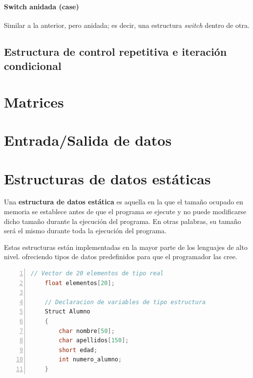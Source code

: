 \documentclass[a4paper, 11pt, titlepage]{article}
\begin{document}
            \paragraph{Switch anidada (case)} Similar a la anterior, pero anidada; es decir,
            una estructura \textit{switch} dentro de otra.

    \subsection{Estructura de control repetitiva e iteración condicional}


\section{Matrices}
    

\section{Entrada/Salida de datos}


\section{Estructuras de datos estáticas}

    Una \textbf{estructura de datos estática} es aquella en la que el tamaño ocupado en memoria se
    establece antes de que el programa se ejecute y no puede modificarse dicho tamaño durante
    la ejecución del programa. En otras palabras, su tamaño será el mismo durante toda la ejecución
    del programa.

    Estas estructuras están implementadas en la mayor parte de los lenguajes de alto nivel. ofreciendo
    tipos de datos predefinidos para que el programador las cree.

    \begin{lstlisting}[language=C,numbers=left]
    // Vector de 20 elementos de tipo real
    float elementos[20];

    // Declaracion de variables de tipo estructura
    Struct Alumno
    {
        char nombre[50];
        char apellidos[150];
        short edad;
        int numero_alumno;
    }\end{lstlisting}
\end{document}
